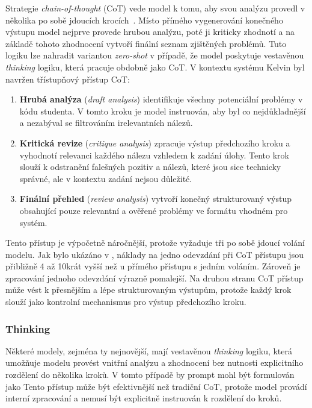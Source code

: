 Strategie \textit{chain-of-thought} (CoT) vede model k tomu, aby svou analýzu provedl v několika po sobě jdoucích krocích~\cite{wei-cot}.
Místo přímého vygenerování konečného výstupu model nejprve provede hrubou analýzu, poté ji kriticky zhodnotí a na základě tohoto zhodnocení vytvoří finální seznam zjištěných problémů.
Tuto logiku lze nahradit variantou \textit{zero-shot} v případě, že model poskytuje vestavěnou \textit{thinking} logiku, která pracuje obdobně jako CoT\@.
V kontextu systému Kelvin byl navržen třístupňový přístup CoT:

\begin{enumerate}
    \item \textbf{Hrubá analýza} (\textit{draft analysis}) identifikuje všechny potenciální problémy v kódu studenta.
    V tomto kroku je model instruován, aby byl co nejdůkladnější a nezabýval se filtrováním irelevantních nálezů.

    \item \textbf{Kritická revize} (\textit{critique analysis}) zpracuje výstup předchozího kroku a vyhodnotí relevanci každého nálezu vzhledem k zadání úlohy.
    Tento krok slouží k odstranění falešných pozitiv a nálezů, které jsou sice technicky správné, ale v kontextu zadání nejsou důležité.

    \item \textbf{Finální přehled} (\textit{review analysis}) vytvoří konečný strukturovaný výstup obsahující pouze relevantní a ověřené problémy ve formátu vhodném pro systém.
\end{enumerate}

Tento přístup je výpočetně náročnější, protože vyžaduje tři po sobě jdoucí volání modelu.
Jak bylo ukázáno v , náklady na jedno odevzdání při CoT přístupu jsou přibližně 4 až 10krát vyšší než u přímého přístupu s jedním voláním.
Zároveň je zpracování jednoho odevzdání výrazně pomalejší.
Na druhou stranu CoT přístup může vést k přesnějším a lépe strukturovaným výstupům, protože každý krok slouží jako kontrolní mechanismus pro výstup předchozího kroku.

\subsubsection*{Thinking}
\label{subsubsec:prompts-strategies-thinking}

Některé modely, zejména ty nejnovější, mají vestavěnou \textit{thinking} logiku, která umožňuje modelu provést vnitřní analýzu a zhodnocení bez nutnosti explicitního rozdělení do několika kroků.
V tomto případě by prompt mohl být formulován jako 
Tento přístup může být efektivnější než tradiční CoT, protože model provádí interní zpracování a nemusí být explicitně instruován k rozdělení do kroků.

\endinput